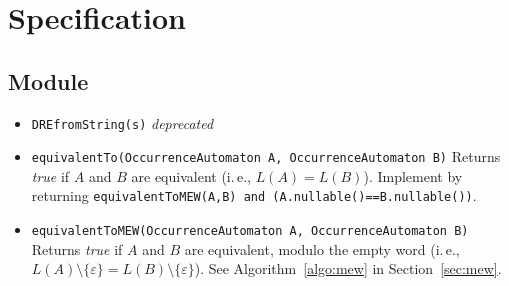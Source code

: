 \documentclass[a4paper,11pt, svgnames,titlepage]{article}
\newcommand{\emptyword}{\varepsilon}
\DeclareMathOperator{\incomp}{\#}
\begin{document}
\section{Specification}\label{sec:spec}
\subsection{Module}\label{sec:des:mod}
\begin{itemize}
	\item\texttt{DREfromString(s)} \emph{deprecated}
\item\texttt{equivalentTo(OccurrenceAutomaton A, OccurrenceAutomaton B)} Returns \emph{true} if $A$ and $B$ are equivalent (i.\,e., $L(A)=L(B)$). Implement by returning \texttt{equivalentToMEW(A,B) and (A.nullable()==B.nullable())}.
\item\texttt{equivalentToMEW(OccurrenceAutomaton A, OccurrenceAutomaton B)} Returns \emph{true} if $A$ and $B$ are equivalent, modulo the empty word (i.\,e., $L(A)\setminus\{\emptyword\}=L(B)\setminus\{\emptyword\}$). See Algorithm~\ref{algo:mew} in Section~\ref{sec:mew}.

\end{itemize}
\end{document}
